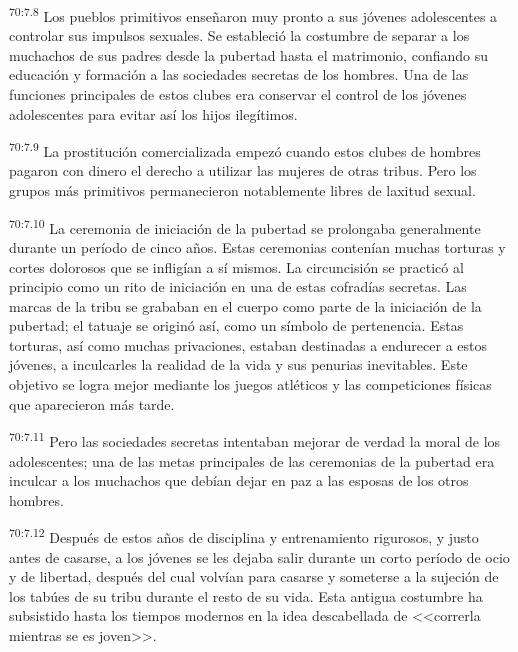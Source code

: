 \par
\textsuperscript{70:7.8} Los pueblos primitivos enseñaron muy pronto a sus jóvenes adolescentes a controlar sus impulsos sexuales. Se estableció la costumbre de separar a los muchachos de sus padres desde la pubertad hasta el matrimonio, confiando su educación y formación a las sociedades secretas de los hombres. Una de las funciones principales de estos clubes era conservar el control de los jóvenes adolescentes para evitar así los hijos ilegítimos.

\par
\textsuperscript{70:7.9} La prostitución comercializada empezó cuando estos clubes de hombres pagaron con dinero el derecho a utilizar las mujeres de otras tribus. Pero los grupos más primitivos permanecieron notablemente libres de laxitud sexual.

\par
\textsuperscript{70:7.10} La ceremonia de iniciación de la pubertad se prolongaba generalmente durante un período de cinco años. Estas ceremonias contenían muchas torturas y cortes dolorosos que se infligían a sí mismos. La circuncisión se practicó al principio como un rito de iniciación en una de estas cofradías secretas. Las marcas de la tribu se grababan en el cuerpo como parte de la iniciación de la pubertad; el tatuaje se originó así, como un símbolo de pertenencia. Estas torturas, así como muchas privaciones, estaban destinadas a endurecer a estos jóvenes, a inculcarles la realidad de la vida y sus penurias inevitables. Este objetivo se logra mejor mediante los juegos atléticos y las competiciones físicas que aparecieron más tarde.

\par
\textsuperscript{70:7.11} Pero las sociedades secretas intentaban mejorar de verdad la moral de los adolescentes; una de las metas principales de las ceremonias de la pubertad era inculcar a los muchachos que debían dejar en paz a las esposas de los otros hombres.

\par
\textsuperscript{70:7.12} Después de estos años de disciplina y entrenamiento rigurosos, y justo antes de casarse, a los jóvenes se les dejaba salir durante un corto período de ocio y de libertad, después del cual volvían para casarse y someterse a la sujeción de los tabúes de su tribu durante el resto de su vida. Esta antigua costumbre ha subsistido hasta los tiempos modernos en la idea descabellada de <<correrla mientras se es joven>>.

